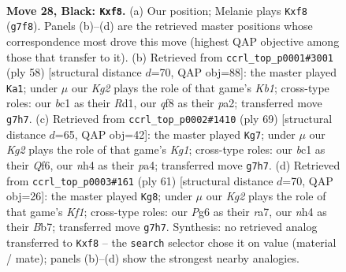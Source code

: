 \documentclass[11pt]{article}
\begin{document}
\clearpage

\begin{figure}[p]\centering
\begin{subfigure}{0.46\textwidth}\centering
\resizebox{\linewidth}{!}{%
\newchessgame
\chessboard[
  setfen={rnb2Q2/p5k1/2p1p1p1/P1Ppq1P1/1P5N/2P5/5K2/R1B5 b - - 3 28},
  showmover=false,
  pgfstyle=straightmove, color=movearrow, markmove={g7-f8}
]}
\caption{}
\end{subfigure}\hfill
\begin{subfigure}{0.46\textwidth}\centering
\resizebox{\linewidth}{!}{%
\newchessgame
\chessboard[
  setfen={r2n4/5pk1/6p1/1q1NP3/p6p/2P1Q2P/pP3PP1/1K1R4 w - - 0 30},
  showmover=false,
  pgfstyle=straightmove, color=movearrow, markmove={b1-a1}
]}
\caption{}
\end{subfigure}
\\[4pt]
\begin{subfigure}{0.46\textwidth}\centering
\resizebox{\linewidth}{!}{%
\newchessgame
\chessboard[
  setfen={4r1k1/5p2/2p2q2/4p1p1/P1P2n1p/1PB1QP1P/K6R/8 b - - 1 35},
  showmover=false,
  pgfstyle=straightmove, color=movearrow, markmove={g8-g7}
]}
\caption{}
\end{subfigure}\hfill
\begin{subfigure}{0.46\textwidth}\centering
\resizebox{\linewidth}{!}{%
\newchessgame
\chessboard[
  setfen={1r3k2/Rbp2p2/3p1qp1/1P1P4/3p1P1p/1B1P3P/5QP1/6K1 b - - 10 31},
  showmover=false,
  pgfstyle=straightmove, color=movearrow, markmove={f8-g8}
]}
\caption{}
\end{subfigure}
\caption{\textbf{Move 28, Black: \texttt{Kxf8}.} (a) Our position; Melanie plays \texttt{Kxf8} (\texttt{g7f8}). Panels (b)--(d) are the retrieved master positions whose correspondence most drove this move (highest QAP objective among those that transfer to it). (b) Retrieved from \texttt{ccrl\_top\_p0001\#3001} (ply 58) [structural distance $d$=70, QAP obj=88]: the master played \texttt{Ka1}; under $\mu$ our \emph{Kg2} plays the role of that game's \emph{Kb1}; cross-type roles: our \emph{b}c1 as their \emph{R}d1, our \emph{q}f8 as their \emph{p}a2; transferred move \texttt{g7h7}. (c) Retrieved from \texttt{ccrl\_top\_p0002\#1410} (ply 69) [structural distance $d$=65, QAP obj=42]: the master played \texttt{Kg7}; under $\mu$ our \emph{Kg2} plays the role of that game's \emph{Kg1}; cross-type roles: our \emph{b}c1 as their \emph{Q}f6, our \emph{n}h4 as their \emph{p}a4; transferred move \texttt{g7h7}. (d) Retrieved from \texttt{ccrl\_top\_p0003\#161} (ply 61) [structural distance $d$=70, QAP obj=26]: the master played \texttt{Kg8}; under $\mu$ our \emph{Kg2} plays the role of that game's \emph{Kf1}; cross-type roles: our \emph{P}g6 as their \emph{r}a7, our \emph{n}h4 as their \emph{B}b7; transferred move \texttt{g7h7}. Synthesis: no retrieved analog transferred to \texttt{Kxf8} -- the \texttt{search} selector chose it on value (material / mate); panels (b)--(d) show the strongest nearby analogies.}
\label{fig:thought-m55}
\end{figure}
\end{document}
